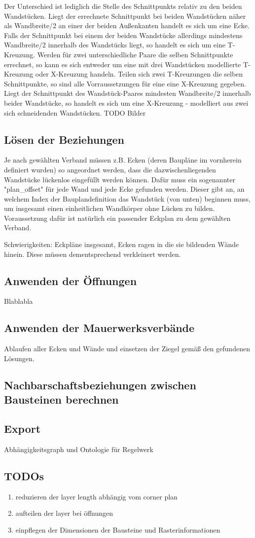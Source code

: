 Der Unterschied ist lediglich die Stelle des Schnittpunkts relativ zu den beiden Wandstücken.
Liegt der errechnete Schnittpunkt bei beiden Wandstücken näher als Wandbreite/2 an einer der beiden Außenkanten handelt es sich um eine Ecke.
Falls der Schnittpunkt bei einem der beiden Wandstücke allerdings mindestens Wandbreite/2 innerhalb des Wandstücks liegt, so handelt es sich um eine T-Kreuzung.
Werden für zwei unterschiedliche Paare die selben Schnittpunkte errechnet, so kann es sich entweder um eine mit drei Wandstücken modellierte T-Kreuzung oder X-Kreuzung handeln.
Teilen sich zwei T-Kreuzungen die selben Schnittpunkte, so sind alle Vorraussetzungen für eine eine X-Kreuzung gegeben.
Liegt der Schnittpunkt des Wandstück-Paares mindesten Wandbreite/2 innerhalb beider Wandstücke, so handelt es sich um eine X-Kreuzung - modelliert aus zwei sich schneidenden Wandstücken. 
TODO Bilder

\subsection*{Lösen der Beziehungen}
Je nach gewählten Verband müssen z.B. Ecken (deren Baupläne im vornherein definiert wurden) so angeordnet werden, dass die dazwischenliegenden Wandstücke lückenlos eingefüllt werden können.
Dafür muss ein sogenannter "plan\_offset" für jede Wand und jede Ecke gefunden werden. Dieser gibt an, an welchem Index der Bauplandefinition das Wandstück (von unten) beginnen muss, um insgesamt einen einheitlichen Wandkörper ohne Lücken zu bilden.
Voraussetzung dafür ist natürlich ein passender Eckplan zu dem gewählten Verband. 

Schwierigkeiten: Eckpläne insgesamt, Ecken ragen in die sie bildenden Wände hinein. Diese müssen dementsprechend verkleinert werden.

\subsection{Anwenden der Öffnungen}
Blablabla

\subsection{Anwenden der Mauerwerksverbände}
Ablaufen aller Ecken und Wände und einsetzen der Ziegel gemäß den gefundenen Lösungen.

\subsection{Nachbarschaftsbeziehungen zwischen Bausteinen berechnen}

\subsection{Export}
Abhängigkeitsgraph und Ontologie für Regelwerk



\subsection*{TODOs}
\begin{enumerate}
  \item reduzieren der layer length abhängig vom corner plan
  \item aufteilen der layer bei öffnungen
  \item einpflegen der Dimensionen der Bausteine und Rasterinformationen
\end{enumerate}
